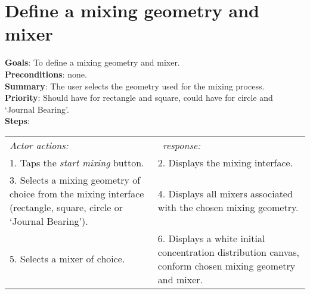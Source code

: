 \section{Define a mixing geometry and mixer}
  \label{geomixer}
  \textbf{Goals}: To define a mixing geometry and mixer.\\
  \textbf{Preconditions}: none.\\
  \textbf{Summary}: The user selects the geometry used for the mixing process.\\
  \textbf{Priority}: Should have for rectangle and square, could have for circle and `Journal Bearing'.\\
  \textbf{Steps}: \\
  \begin{tabular}{ p{} p{} }
  	\emph{Actor actions:} & \emph{\projectname\ response:} \\
	1. Taps the \emph{start mixing} button. & 2. Displays the mixing interface.\\
	3. Selects a mixing geometry of choice from the mixing interface (rectangle, square, circle or `Journal Bearing'). & 4. Displays all mixers associated with the chosen mixing geometry. \\
	5. Selects a mixer of choice. & 6. Displays a white initial concentration distribution canvas, conform chosen mixing geometry and mixer.\\
  \end{tabular}

